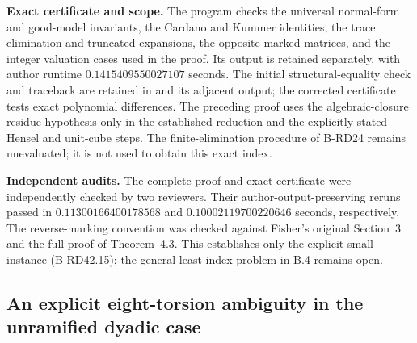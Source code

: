 \par\smallskip\noindent\textbf{Exact certificate and scope.}
The program  checks the universal
normal-form and good-model invariants, the Cardano and Kummer identities,
the trace elimination and truncated expansions, the opposite marked
matrices, and the integer valuation cases used in the proof. Its output
is retained separately, with author runtime $0.1415409550027107$ seconds.
The initial structural-equality check and traceback are retained in
 and
its adjacent output; the corrected certificate tests exact polynomial
differences. The preceding proof uses the algebraic-closure
residue hypothesis only in the established reduction and the explicitly
stated Hensel and unit-cube steps. The finite-elimination procedure of
B-RD24 remains unevaluated; it is not used to obtain this exact index.

\par\smallskip\noindent\textbf{Independent audits.}
The complete proof and exact certificate were independently checked by
two reviewers. Their author-output-preserving reruns passed in
$0.11300166400178568$ and $0.10002119700220646$ seconds, respectively.
The reverse-marking convention was checked against Fisher's original
Section~3 and the full proof of Theorem~4.3. This establishes only the
explicit small instance (B-RD42.15); the general least-index problem
in B.4 remains open.


\subsection{An explicit eight-torsion ambiguity in the unramified dyadic case}

